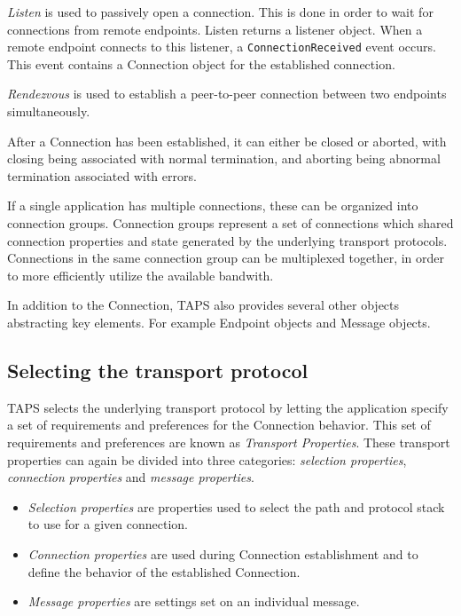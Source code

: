 \textit{Listen} is used to passively open a connection. This is done in order to
wait for connections from remote endpoints. Listen returns a listener
object. When a remote endpoint connects to this listener, a \texttt{ConnectionReceived}
event occurs. This event contains a Connection object for the 
established connection.

\textit{Rendezvous} is used to establish a peer-to-peer connection between two endpoints
simultaneously.

After a Connection has been established, it can either
be closed or aborted, with closing being associated with normal termination,
and aborting being abnormal termination associated with errors.

If a single application has multiple connections, these can be organized
into connection groups. Connection groups represent a set of connections
which shared connection properties and state generated by the underlying
transport protocols. Connections in the same connection group can be
multiplexed together, in order to more efficiently utilize the available
bandwith.

In addition to the Connection, TAPS also provides several other objects
abstracting key elements. For example Endpoint objects and Message objects.

\subsection{Selecting the transport protocol}
TAPS selects the underlying transport protocol by
letting the application specify a set of requirements
and preferences for the Connection behavior. This set of requirements
and preferences are known as \textit{Transport Properties}. These transport
properties can again be divided into three categories: \textit{selection
properties}, \textit{connection properties} and \textit{message properties}. 

\begin{itemize}
    \item \textit{Selection
properties} are properties used to select the path and protocol stack
to use for a given connection. 

    \item \textit{Connection properties} are used
during Connection establishment and to define the behavior of the
established Connection. 

    \item \textit{Message properties} are settings set on an
individual message. 
\end{itemize}

